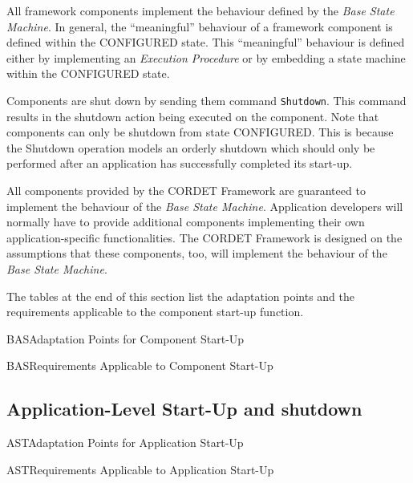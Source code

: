 \documentclass[a4paper,10pt]{article}
\newenvironment{cr_req}[2]
{%
\begin{longtable}{|l|p{9.8cm}|}
\caption{#2} \\
\hline
\rowcolor{light-gray}
\textbf{Req. ID} & \textbf{Requirement Text}\\
\hline\hline
\endfirsthead
\rowcolor{light-gray}
\textbf{Req. ID} & \textbf{Requirement Text}\\
\hline\hline
\endhead
\DTLforeach*[\DTLiseq{\cat}{#1}]{dbReq}{\cat=Category,\type=Type,\id=Id,\reqText=Text}
{\DTLiffirstrow{}{\\\hline}\cat-\id/\type & \textit{\reqText}}\\\hline
}
{\end{longtable}}
\newenvironment{cr_ap}[2]
{%
\begin{longtable}{|l|p{4.7cm}|p{4.9cm}|}
\caption{#2} \\
\hline
\rowcolor{light-gray}
\textbf{AP ID} & \textbf{Adaptation Point} & \textbf{Default Value}\\
\hline\hline
\endfirsthead
\rowcolor{light-gray}
\textbf{AP ID} & \textbf{Adaptation Point} & \textbf{Default Value}\\
\hline\hline
\endhead
\DTLforeach*[\DTLiseq{\cat}{#1}]{dbAP}{\cat=Category,\id=Id,\ap=AP,\defValue=DefValue}
{\DTLiffirstrow{}{\\\hline}\cat-\id & \ap & \defValue}\\\hline
}
{\end{longtable}}
\begin{document}
All framework components implement the behaviour defined by the \textit{Base State Machine}. In general, the “meaningful” behaviour of a framework component is defined within the CONFIGURED state. 
This “meaningful” behaviour is defined either by implementing an \textit{Execution Procedure} or by embedding a state machine within the CONFIGURED state.

Components are shut down by sending them command \texttt{Shutdown}. 
This command results in the shutdown action being executed on the component. 
Note that components can only be shutdown from state CONFIGURED.
This is because the Shutdown operation models an orderly shutdown which should only be performed after an application has successfully completed its start-up. 

All components provided by the CORDET Framework are guaranteed to implement the behaviour of the \textit{Base State Machine}. 
Application developers will normally have to provide additional components implementing their own application-specific functionalities.
The CORDET Framework is designed on the assumptions that these components, too, will implement the behaviour of the \textit{Base State Machine}.

The tables at the end of this section list the adaptation points and the requirements applicable to the component start-up function.

\begin{cr_ap}{BAS}{Adaptation Points for Component Start-Up}
\end{cr_ap}

\begin{cr_req}{BAS}{Requirements Applicable to Component Start-Up}
\end{cr_req}
 
\subsection{Application-Level Start-Up and shutdown}\label{sec:AppStartUp}



\begin{cr_ap}{AST}{Adaptation Points for Application Start-Up}
\end{cr_ap}

\begin{cr_req}{AST}{Requirements Applicable to Application Start-Up}
\end{cr_req}
\end{document}
